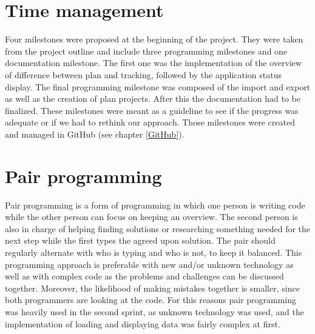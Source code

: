 \section{Time management} \label{Time management}
Four milestones were proposed at the beginning of the project. They were taken from the project outline and include three programming milestones and one documentation milestone. The first one was the implementation of the overview of difference between plan and tracking, followed by the application status display. The final programming milestone was composed of the import and export as well as the creation of plan projects. After this the documentation had to be finalized. These milestones were meant as a guideline to see if the progress was adequate or if we had to rethink our approach. Those milestones were created and managed in GitHub (see chapter \ref{GitHub}). 

\section{Pair programming}
Pair programming \cite{pairprogramming-url} is a form of programming in which one person is writing code while the other person can focus on keeping an overview. The second person is also in charge of helping finding solutions or researching something needed for the next step while the first types the agreed upon solution. The pair should regularly alternate with who is typing and who is not, to keep it balanced. This programming approach is preferable with new and/or unknown technology as well as with complex code as the problems and challenges can be discussed together. Moreover, the likelihood of making mistakes together is smaller, since both programmers are looking at the code. For this reasons pair programming was heavily used in the second sprint, as unknown technology was used, and the implementation of loading and displaying data was fairly complex at first. 


